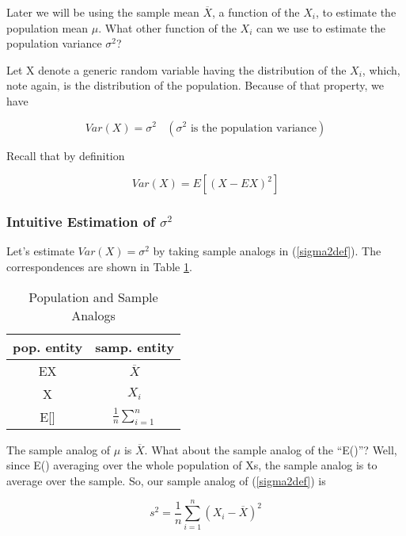 Later we will be using the sample mean $\overline{X}$, a function of the
$X_i$, to estimate the population mean $\mu$.  What other function of the
$X_i$ can we use to estimate the population variance $\sigma^2$?

Let X denote a generic random variable having the distribution of the
$X_i$, which, note again, is the distribution of the population.
Because of that property, we have

\begin{equation}
Var(X) = \sigma^2   ~~~~ (\sigma^2 \textrm{ is the population variance})
\end{equation}

Recall that by definition

\begin{equation}
\label{sigma2def}
Var(X)
= E[(X-EX)^2]
\end{equation}

\subsubsection{Intuitive Estimation of $\sigma^2$}

Let's estimate $Var(X) = \sigma^2$ by taking sample analogs
in (\ref{sigma2def}).  The correspondences are shown in Table
\ref{analogs}.

\begin{table}
\vskip 0.5in
\begin{center}
\begin{tabular}{|c|c|}
\hline
pop. entity & samp. entity \\ \hline 
\hline
EX & $\overline{X}$ \\ \hline 
X & $X_i$ \\ \hline
E[] & $\frac{1}{n} \sum_{i=1}^n$ \\ \hline
\end{tabular}
\caption{Population and Sample Analogs}
\label{analogs}
\end{center}
\end{table}

The sample analog of $\mu$ is $\overline{X}$.  What about the sample
analog of the ``E()''?  Well, since E() averaging over the whole
population of Xs, the sample analog is to average over the sample.  So,
our sample analog of (\ref{sigma2def}) is

\begin{equation}
\label{s2}
s^2 = \frac{1}{n} \sum_{i=1}^{n} (X_i-\overline{X})^2 
\end{equation}

